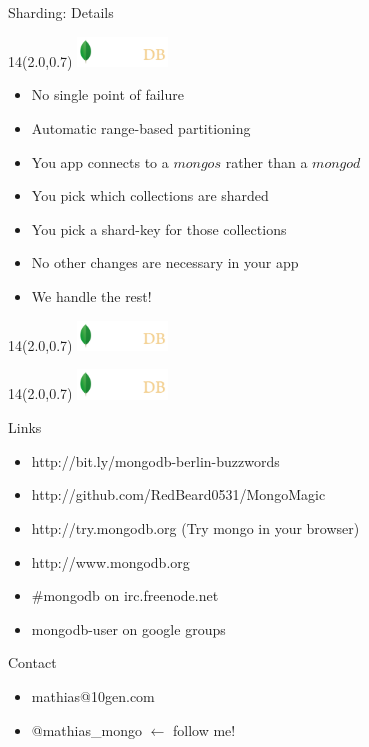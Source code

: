 \documentclass{beamer}
\newcommand{\MongoLogo}{
\begin{textblock}{14}(2.0,0.7)
  \includegraphics[height=0.8cm]{logo-mongodb-ondark.png}
\end{textblock}
}
\begin{document}
\begin{frame}[fragile]{Sharding: Details}
  \MongoLogo
  \begin{itemize}
    \item No single point of failure
    \item Automatic range-based partitioning
    \item You app connects to a $mongos$ rather than a $mongod$
    \item You pick which collections are sharded
    \item You pick a shard-key for those collections
    \item No other changes are necessary in your app
    \item We handle the rest!
  \end{itemize}
\end{frame}

\begin{frame}
  \MongoLogo
  \center
\end{frame}

\begin{frame}
  \MongoLogo


  \begin{block}{Links}
  \begin{itemize}
    \item http://bit.ly/mongodb-berlin-buzzwords
    \item http://github.com/RedBeard0531/MongoMagic
    \item http://try.mongodb.org (Try mongo in your browser)
    \item http://www.mongodb.org
    \item \#mongodb on irc.freenode.net
    \item mongodb-user on google groups
  \end{itemize}
  \end{block}

  \begin{block}{Contact}
  \begin{itemize}
    \item mathias@10gen.com
    \item @mathias\_mongo ${\leftarrow}$ follow me!
  \end{itemize}
  \end{block}
\end{frame}
\end{document}
